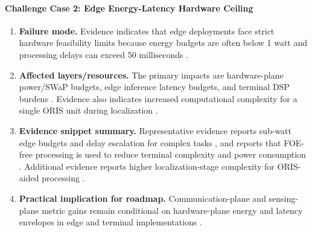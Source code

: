 \documentclass[lettersize,journal]{IEEEtran}
\begin{document}
\paragraph{Challenge Case 2: Edge Energy-Latency Hardware Ceiling}
\begin{enumerate}
    \item \textbf{Failure mode.} Evidence indicates that edge deployments face strict hardware feasibility limits because energy budgets are often below 1 watt and processing delays can exceed 50 milliseconds \cite{O_ISAC_093}.
    \item \textbf{Affected layers/resources.} The primary impacts are hardware-plane power/SWaP budgets, edge inference latency budgets, and terminal DSP burdens \cite{O_ISAC_093, O_ISAC_095}. Evidence also indicates increased computational complexity for a single ORIS unit during localization \cite{O_ISAC_112}.
    \item \textbf{Evidence snippet summary.} Representative evidence reports sub-watt edge budgets and delay escalation for complex tasks \cite{O_ISAC_093}, and reports that FOE-free processing is used to reduce terminal complexity and power consumption \cite{O_ISAC_095}. Additional evidence reports higher localization-stage complexity for ORIS-aided processing \cite{O_ISAC_112}.
    \item \textbf{Practical implication for roadmap.} Communication-plane and sensing-plane metric gains remain conditional on hardware-plane energy and latency envelopes in edge and terminal implementations \cite{O_ISAC_093, O_ISAC_095, O_ISAC_112}.
\end{enumerate}
\end{document}
